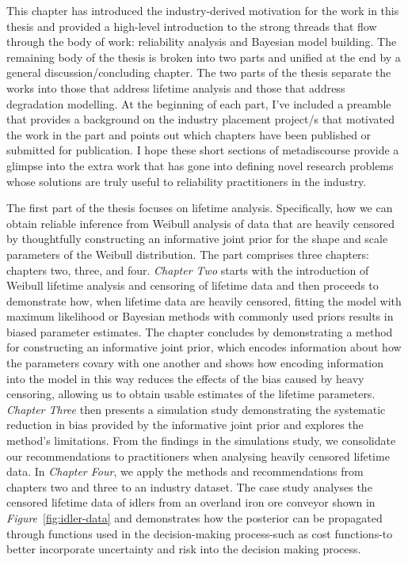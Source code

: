 This chapter has introduced the industry-derived motivation for the work in this thesis and provided a high-level introduction to the strong threads that flow through the body of work: reliability analysis and Bayesian model building. The remaining body of the thesis is broken into two parts and unified at the end by a general discussion/concluding chapter. The two parts of the thesis separate the works into those that address lifetime analysis and those that address degradation modelling. At the beginning of each part, I've included a preamble that provides a background on the industry placement project/s that motivated the work in the part and points out which chapters have been published or submitted for publication. I hope these short sections of metadiscourse provide a glimpse into the extra work that has gone into defining novel research problems whose solutions are truly useful to reliability practitioners in the industry.

The first part of the thesis focuses on lifetime analysis. Specifically, how we can obtain reliable inference from Weibull analysis of data that are heavily censored by thoughtfully constructing an informative joint prior for the shape and scale parameters of the Weibull distribution. The part comprises three chapters: chapters two, three, and four. \textit{Chapter Two} starts with the introduction of Weibull lifetime analysis and censoring of lifetime data and then proceeds to demonstrate how, when lifetime data are heavily censored, fitting the model with maximum likelihood or Bayesian methods with commonly used priors results in biased parameter estimates. The chapter concludes by demonstrating a method for constructing an informative joint prior, which encodes information about how the parameters covary with one another and shows how encoding information into the model in this way reduces the effects of the bias caused by heavy censoring, allowing us to obtain usable estimates of the lifetime parameters. \textit{Chapter Three} then presents a simulation study demonstrating the systematic reduction in bias provided by the informative joint prior and explores the method's limitations. From the findings in the simulations study, we consolidate our recommendations to practitioners when analysing heavily censored lifetime data. In \textit{Chapter Four}, we apply the methods and recommendations from chapters two and three to an industry dataset. The case study analyses the censored lifetime data of idlers from an overland iron ore conveyor shown in \textit{Figure}~\ref{fig:idler-data} and demonstrates how the posterior can be propagated through functions used in the decision-making process-such as cost functions-to better incorporate uncertainty and risk into the decision making process.

